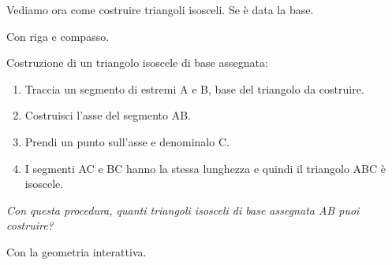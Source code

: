 \begin{comment}
 
Con riga e compasso.

\begin{procedura}[Triangolo equilatero]\label{proc:fonda_equilatero}
  Dati due punti A e B, si deve costruire un punto C in modo che ABC sia un 
triangolo equilatero:
  \begin{enumerate} [nosep]
    \item 
    Traccia i punti A e B.
    \item 
    Traccia la circonferenza di centro A e passante per B.
    \item 
    Traccia la circonferenza di centro B e passante per A.
    \item 
    Individua un punto C di intersezione delle due circonferenze.
    \item 
    Il poligono ABC è il triangolo richiesto.    
  \end{enumerate}
\end{procedura}

Con la geometria interattiva.


\end{comment}

Vediamo ora come costruire triangoli isosceli. Se è data la base.

Con riga e compasso.

\begin{procedura}
  Costruzione di un triangolo isoscele di base assegnata:
  \begin{enumerate} [nosep]
    \item 
    Traccia un segmento di estremi A e B, base del triangolo da costruire.
    \item 
    Costruisci l'asse del segmento AB.
    \item 
    Prendi un punto sull'asse e denominalo C.
    \item 
    I segmenti AC e BC hanno la stessa lunghezza e quindi il triangolo ABC è 
isoscele.
  \end{enumerate}
\textit{ Con questa procedura, quanti triangoli isosceli di base assegnata AB 
puoi costruire?}  
\end{procedura}
 
Con la geometria interattiva.


